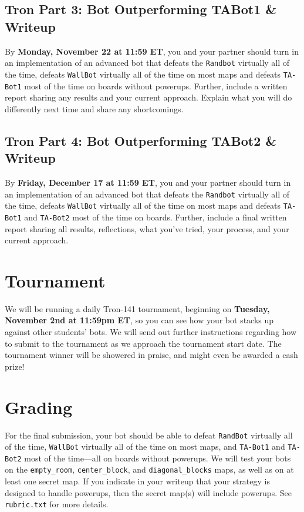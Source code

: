 \documentclass{article}
\begin{document}
\subsection{Tron Part 3: Bot Outperforming TABot1 \& Writeup}
By \textbf{Monday, November 22 at 11:59 ET}, you and your partner should turn in an implementation of an advanced bot that defeats the \texttt{Randbot} virtually all of the time, defeats \texttt{WallBot} virtually all of the time on most maps and defeats \texttt{TA-Bot1} most of the time on boards without powerups. Further, include a written report sharing any results and your current approach. Explain what you will do differently next time and share any shortcomings. 

\subsection{Tron Part 4: Bot Outperforming TABot2 \& Writeup}
By \textbf{Friday, December 17 at 11:59 ET}, you and your partner should turn in an implementation of an advanced bot that defeats the \texttt{Randbot} virtually all of the time, defeats \texttt{WallBot} virtually all of the time on most maps and defeats \texttt{TA-Bot1} and \texttt{TA-Bot2} most of the time on boards. Further, include a final written report sharing all results, reflections, what you've tried, your process, and your current approach. 

\section{Tournament}
We will be running a daily Tron-141 tournament, beginning on
\textbf{Tuesday, November 2nd at 11:59pm ET}, so you can see how your
bot stacks up against other students' bots.  
\newline
\newline
We will send out further instructions regarding how to submit to the tournament as we approach the tournament start date. 
\newline
\newline
The tournament winner will be showered in praise, and might even be awarded a cash prize!

\section{Grading}
For the final submission, your bot should be able to defeat \texttt{RandBot} virtually all of
the time, \texttt{WallBot} virtually all of the time on most maps, and
\texttt{TA-Bot1} and \texttt{TA-Bot2} most of the time---all on boards
without powerups.  We will test your bots on the \texttt{empty\_room},
\texttt{center\_block}, and \texttt{diagonal\_blocks} maps, as well as
on at least one secret map.  If you indicate in your writeup that your
strategy is designed to handle powerups, then the secret map(s) will
include powerups.  See \texttt{rubric.txt} for more details.
\end{document}
